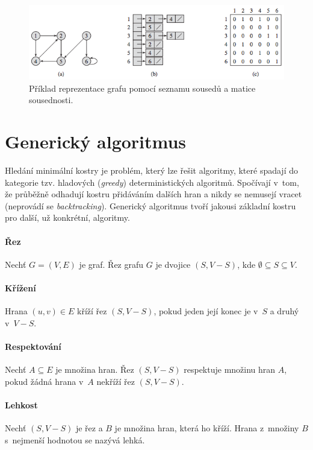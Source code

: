 \begin{figure}[H]
    \centering
    \includegraphics[width=1\linewidth]{graph_representations_example.png}
    \caption{Příklad reprezentace grafu pomocí seznamu sousedů a matice sousednosti.}
\end{figure}


\section{Generický algoritmus}

Hledání minimální kostry je problém, který lze řešit algoritmy, které spadají do kategorie tzv. hladových (\textit{greedy}) deterministických algoritmů. Spočívají v~tom, že průběžně odhadují kostru přidáváním dalších hran a nikdy se nemusejí vracet (neprovádí se \textit{backtracking}). Generický algoritmus tvoří jakousi základní kostru pro další, už konkrétní, algoritmy.

\paragraph*{Řez} Nechť $G = (V, E)$ je graf. Řez grafu $G$ je dvojice $(S, V - S)$, kde $\emptyset \subseteq S \subseteq V$.

\paragraph*{Křížení} Hrana $(u, v) \in E$ kříží řez $(S, V - S)$, pokud jeden její konec je v~$S$ a druhý v~$V - S$.

\paragraph*{Respektování} Nechť $A \subseteq E$ je množina hran. Řez $(S, V - S)$ respektuje množinu hran $A$, pokud žádná hrana v~$A$ nekříží řez $(S, V - S)$.

\paragraph*{Lehkost} Nechť $(S, V - S)$ je řez a $B$ je množina hran, která ho kříží. Hrana z~množiny $B$ s~nejmenší hodnotou se nazývá lehká.

